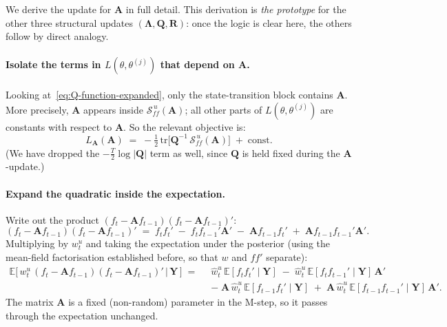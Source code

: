 \documentclass[11pt, a4paper, oneside]{article}
\newcommand{\mY}{\mathbf{Y}}
\newcommand{\mL}{\boldsymbol{\Lambda}}
\newcommand{\mA}{\mathbf{A}}
\newcommand{\mR}{\mathbf{R}}
\newcommand{\mQ}{\mathbf{Q}}
\begin{document}
We derive the update for $\mA$ in full detail. This derivation is
\emph{the prototype} for the other three structural updates
$(\mL, \mQ, \mR)$: once the logic is clear here, the others follow
by direct analogy.

\paragraph{Isolate the terms in $L(\theta, \theta^{(j)})$ that depend on $\mA$.}
Looking at~\eqref{eq:Q-function-expanded}, only the state-transition
block contains $\mA$. More precisely, $\mA$ appears inside
$\mathcal{S}_{ff}^{\,u}(\mA)$; all other parts of
$L(\theta, \theta^{(j)})$ are constants with respect to $\mA$. So the
relevant objective is:
\begin{equation}
L_{\mA}(\mA) \;=\; -\tfrac{1}{2}\,\mathrm{tr}\!\Big[\mQ^{-1}\, \mathcal{S}_{ff}^{\,u}(\mA)\Big]
\;+\; \text{const}.
\label{eq:L-A-step1}
\end{equation}
(We have dropped the $-\tfrac{T}{2}\log|\mQ|$ term as well, since $\mQ$
is held fixed during the $\mA$-update.)

\paragraph{Expand the quadratic inside the expectation.}
Write out the product $(f_t - \mA f_{t-1})(f_t - \mA f_{t-1})'$:
\[
(f_t - \mA f_{t-1})(f_t - \mA f_{t-1})'
\;=\; f_t f_t' \;-\; f_t f_{t-1}' \mA' \;-\; \mA f_{t-1} f_t' \;+\; \mA f_{t-1} f_{t-1}' \mA'.
\]
Multiplying by $w^u_t$ and taking the expectation under the posterior
(using the mean-field factorisation established before, so that $w$ and $ff'$
separate):
\begin{align*}
\mathbb{E}\!\big[\, w^u_t\, (f_t - \mA f_{t-1})(f_t - \mA f_{t-1})' \,\big|\, \mY\,\big]
\;=\;\;
& \hat{w}^u_t\, \mathbb{E}[f_t f_t' \mid \mY]
\;-\; \hat{w}^u_t\, \mathbb{E}[f_t f_{t-1}' \mid \mY]\,\mA' \\[2pt]
& -\; \mA\, \hat{w}^u_t\, \mathbb{E}[f_{t-1} f_t' \mid \mY]
\;+\; \mA\, \hat{w}^u_t\, \mathbb{E}[f_{t-1} f_{t-1}' \mid \mY]\, \mA'.
\end{align*}
The matrix $\mA$ is a fixed (non-random) parameter in the M-step, so
it passes through the expectation unchanged.
\end{document}
